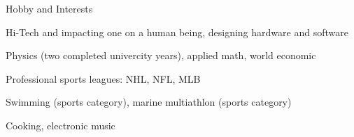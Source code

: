 \documentclass{template}
\begin{document}
\begin{rSection}{Hobby and Interests}

\begin{rHobby}
\item Hi-Tech and impacting one on a human being, designing hardware and software
\item Physics (two completed univercity years), applied math, world economic
\item Professional sports leagues: NHL, NFL, MLB
\item Swimming (sports category), marine multiathlon (sports category)
\item Cooking, electronic music
\end{rHobby}

\end{rSection}

\end{document}
